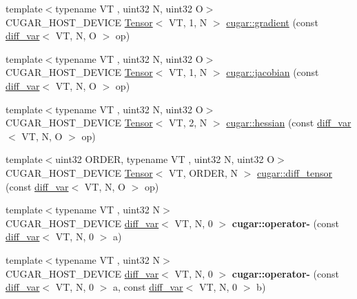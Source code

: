 \begin{DoxyCompactItemize}
\item 
{\footnotesize template$<$typename VT , uint32 N, uint32 O$>$ }\\C\+U\+G\+A\+R\+\_\+\+H\+O\+S\+T\+\_\+\+D\+E\+V\+I\+CE \hyperlink{structcugar_1_1_tensor}{Tensor}$<$ VT, 1, N $>$ \hyperlink{group___auto_diff_module_ga1e2e54616fb22c1790370f97fe73c4f2}{cugar\+::gradient} (const \hyperlink{structcugar_1_1diff__var}{diff\+\_\+var}$<$ VT, N, O $>$ op)
\item 
{\footnotesize template$<$typename VT , uint32 N, uint32 O$>$ }\\C\+U\+G\+A\+R\+\_\+\+H\+O\+S\+T\+\_\+\+D\+E\+V\+I\+CE \hyperlink{structcugar_1_1_tensor}{Tensor}$<$ VT, 1, N $>$ \hyperlink{group___auto_diff_module_ga877e235be40a2961820c6caa2249adc7}{cugar\+::jacobian} (const \hyperlink{structcugar_1_1diff__var}{diff\+\_\+var}$<$ VT, N, O $>$ op)
\item 
{\footnotesize template$<$typename VT , uint32 N, uint32 O$>$ }\\C\+U\+G\+A\+R\+\_\+\+H\+O\+S\+T\+\_\+\+D\+E\+V\+I\+CE \hyperlink{structcugar_1_1_tensor}{Tensor}$<$ VT, 2, N $>$ \hyperlink{group___auto_diff_module_ga4805d8e3da7f18fc7305c77432e6519b}{cugar\+::hessian} (const \hyperlink{structcugar_1_1diff__var}{diff\+\_\+var}$<$ VT, N, O $>$ op)
\item 
{\footnotesize template$<$uint32 O\+R\+D\+ER, typename VT , uint32 N, uint32 O$>$ }\\C\+U\+G\+A\+R\+\_\+\+H\+O\+S\+T\+\_\+\+D\+E\+V\+I\+CE \hyperlink{structcugar_1_1_tensor}{Tensor}$<$ VT, O\+R\+D\+ER, N $>$ \hyperlink{group___auto_diff_module_gad3b328633420b6077be413a7cdfef6a8}{cugar\+::diff\+\_\+tensor} (const \hyperlink{structcugar_1_1diff__var}{diff\+\_\+var}$<$ VT, N, O $>$ op)
\item 
\mbox{\label{group___auto_diff_module_ga94f5647797fac4dee2a587f80a4209cf}} 
{\footnotesize template$<$typename VT , uint32 N$>$ }\\C\+U\+G\+A\+R\+\_\+\+H\+O\+S\+T\+\_\+\+D\+E\+V\+I\+CE \hyperlink{structcugar_1_1diff__var}{diff\+\_\+var}$<$ VT, N, 0 $>$ {\bfseries cugar\+::operator-\/} (const \hyperlink{structcugar_1_1diff__var}{diff\+\_\+var}$<$ VT, N, 0 $>$ a)
\item 
\mbox{\label{group___auto_diff_module_ga326635366e7d9e04806fb82ab7c451ea}} 
{\footnotesize template$<$typename VT , uint32 N$>$ }\\C\+U\+G\+A\+R\+\_\+\+H\+O\+S\+T\+\_\+\+D\+E\+V\+I\+CE \hyperlink{structcugar_1_1diff__var}{diff\+\_\+var}$<$ VT, N, 0 $>$ {\bfseries cugar\+::operator-\/} (const \hyperlink{structcugar_1_1diff__var}{diff\+\_\+var}$<$ VT, N, 0 $>$ a, const \hyperlink{structcugar_1_1diff__var}{diff\+\_\+var}$<$ VT, N, 0 $>$ b)

\end{DoxyCompactItemize}
